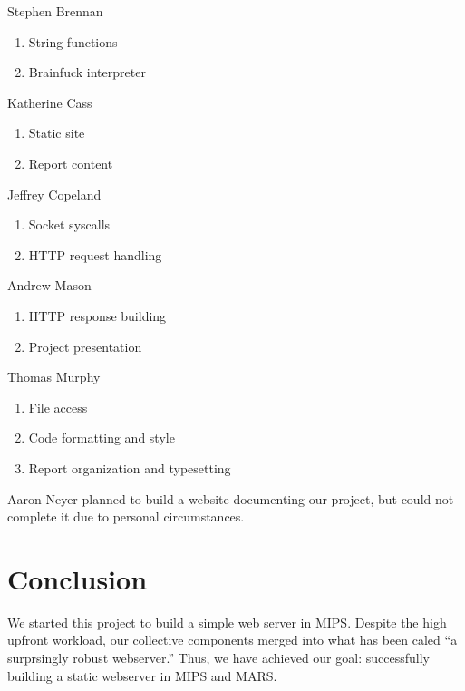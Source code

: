 \documentclass[journal,10pt]{IEEEtran}
\begin{document}
\begin{LaTeXitemize} \itemsep0pt \parskip0pt
  \item Stephen Brennan
  \begin{enumerate}
    \item String functions
    \item Brainfuck interpreter
  \end{enumerate}

  \item Katherine Cass
  \begin{enumerate}
    \item Static site
    \item Report content
  \end{enumerate}

  \item Jeffrey Copeland
  \begin{enumerate}
    \item Socket syscalls
    \item HTTP request handling
  \end{enumerate}

  \item Andrew Mason
  \begin{enumerate}
    \item HTTP response building
    \item Project presentation
  \end{enumerate}

  \item Thomas Murphy
  \begin{enumerate}
    \item File access
    \item Code formatting and style
    \item Report organization and typesetting
  \end{enumerate}

\end{LaTeXitemize}

Aaron Neyer planned to build a website documenting our project, but could not
complete it due to personal circumstances.

\section{Conclusion}
We started this project to build a simple web server in MIPS. Despite the high
upfront workload, our collective components merged into what has been caled ``a
surprsingly robust webserver.'' Thus, we have achieved our goal: successfully
building a static webserver in MIPS and MARS.
\end{document}
